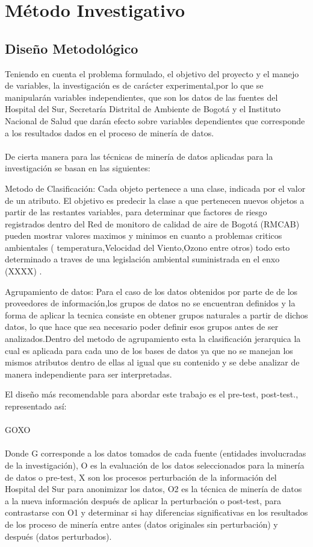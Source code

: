 \documentclass[a4paper,openright,12pt]{book}
\theoremstyle{definition}
\theoremstyle{remark}
\begin{document}
\section{Método Investigativo}
	\subsection{Diseño Metodológico}

Teniendo  en  cuenta el  problema formulado,  el objetivo del proyecto y  el manejo de variables, la  investigación es de carácter experimental,por lo que se manipularán variables independientes, que son los datos de las fuentes del Hospital del Sur, Secretaría Distrital de Ambiente de Bogotá y el Instituto Nacional de Salud que darán efecto sobre variables dependientes que corresponde a los resultados dados en el proceso de minería de datos.\\\\
De cierta manera  para las técnicas de minería de datos aplicadas para la investigación se basan en las siguientes:

Metodo de Clasificación: Cada objeto pertenece a una clase, indicada por el valor de un atributo. El objetivo es predecir la clase a que pertenecen nuevos objetos a partir de las restantes variables, para determinar que factores de riesgo registrados dentro del Red de monitoro de calidad de aire de Bogotá (RMCAB) pueden mostrar valores maximos y minimos en cuanto a problemas criticos ambientales ( temperatura,Velocidad del Viento,Ozono entre otros) todo esto determinado a traves de una legislación ambiental suministrada en el enxo (XXXX) .

Agrupamiento de datos: Para el caso de los datos obtenidos por parte de de los proveedores de  información,los grupos de datos no se encuentran definidos y la forma de aplicar la tecnica consiste en obtener grupos naturales a partir de dichos datos, lo que hace que sea necesario poder definir esos grupos antes de ser analizados.Dentro del metodo de agrupamiento esta la clasificación jerarquica la cual es aplicada para cada uno de los bases de datos ya que no se manejan los mismos atributos dentro de ellas al igual que su contenido y se debe analizar de manera independiente para ser interpretadas.

El diseño  más  recomendable para abordar este trabajo es el  pre-test, post-test., representado así:\\\\
GOXO\\\\
Donde G corresponde a los datos tomados de cada fuente (entidades involucradas de la investigación), O es la evaluación de los datos seleccionados para la minería de datos o pre-test, X son los procesos perturbación de la información del Hospital del Sur para anonimizar los datos, O2 es la técnica de minería de datos a la nueva información después de aplicar la perturbación o post-test, para  contrastarse con O1 y determinar si hay  diferencias significativas en los resultados de los proceso de minería entre antes (datos originales sin perturbación) y después (datos perturbados).
\end{document}

